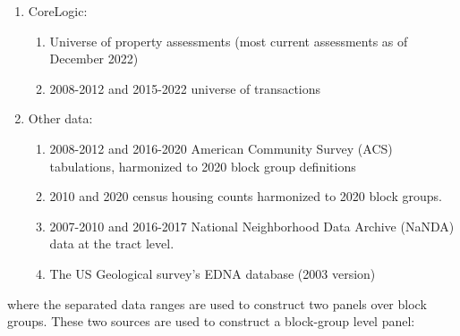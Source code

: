 \documentclass[12pt]{article}
\begin{document}
	\begin{enumerate}
		\item CoreLogic:
		
		\begin{enumerate}
			\item Universe of property assessments (most current assessments as of December 2022) 
			
			\item 2008-2012 and 2015-2022 universe of transactions
		\end{enumerate} 
		
		\item Other data:
		\begin{enumerate}
			\item 2008-2012 and 2016-2020 American Community Survey (ACS) tabulations, harmonized to 2020 block group definitions
			
			\item 2010 and 2020 census housing counts harmonized to 2020 block groups.
			
			\item 2007-2010 and 2016-2017 National Neighborhood Data Archive (NaNDA) data at the tract level. 
			
			\item The US Geological survey's EDNA database (2003 version)
		\end{enumerate}
	\end{enumerate} 
	where the separated data ranges are used to construct two panels over block groups. These two sources are used to construct a block-group level panel:
	
\end{document}
